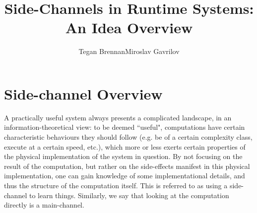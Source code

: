 \documentclass{article}
\begin{document}
     
\title{Side-Channels in Runtime Systems:\\ An Idea Overview}
\author{Tegan Brennan\qquad Miroslav Gavrilov}
\maketitle

\section{Side-channel Overview}

A practically useful system always presents a complicated landscape, in an
information-theoretical view: to be deemed ``useful", computations have certain
characteristic behaviours they should follow (e.g. be of a certain complexity
class, execute at a certain speed, etc.), which more or less exerts certain
properties of the physical implementation of the system in question. By not
focusing on the result of the computation, but rather on the side-effects
manifest in this physical implementation, one can gain knowledge of some
implementational details, and thus the structure of the computation itself. This
is referred to as using a side-channel to learn things. Similarly, we say that
looking at the computation directly is a main-channel.
\end{document}
